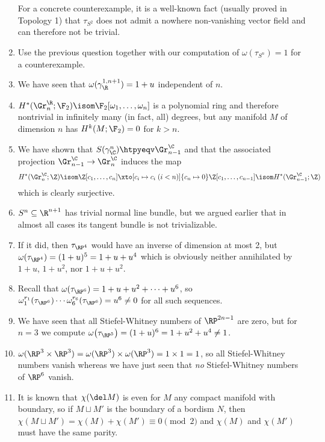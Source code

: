 \begin{answers}
\begin{enumerate}
			For a concrete counterexample, it is a well-known fact (usually proved in Topology 1) that $\tau_{S^2}$ does not admit a nowhere non-vanishing vector field and can therefore not be trivial.
		\item {} Use the previous question together with our computation of $\omega(\tau_{S^n}) = 1$ for a counterexample.
		\item We have seen that $\omega(\gamma_\R^{1, n + 1}) = 1 + u$ independent of $n$.
		\item {} $H^*(\Gr_n^\R; \F_2) \isom \F_2[\omega_1, \ldots, \omega_n]$ is a polynomial ring and therefore nontrivial in infinitely many (in fact, all) degrees, but any manifold $M$ of dimension $n$ has $H^k(M; \F_2) = 0$ for $k > n$.
		\item {} We have shown that $S(\gamma_\C^n) \htpyeqv \Gr^\C_{n - 1}$ and that the associated projection $\Gr_{n - 1}^\C \to \Gr_n^\C$ induces the map
			\begin{equation*}
				H^*(\Gr_n^\C; \Z) \isom \Z[c_1, \ldots, c_n] \xto[c_i \mapsto c_i\; (i < n)]{c_n \mapsto 0} \Z[c_1, \ldots, c_{n - 1}] \isom H^*(\Gr_{n - 1}^\C; \Z) 
			\end{equation*}
			which is clearly surjective.
		\item {} $S^n \subseteq \R^{n + 1}$ has trivial normal line bundle, but we argued earlier that in almost all cases its tangent bundle is not trivializable.
		\item {} If it did, then $\tau_{\RP^4}$ would have an inverse of dimension at most 2, but $\omega(\tau_{\RP^4}) = (1 + u)^5 = 1 + u + u^4$ which is obviously neither annihilated by $1 + u$, $1 + u^2$, nor $1 + u + u^2$.
		\item {} Recall that $\omega(\tau_{\RP^6}) = 1 + u + u^2 + \cdots + u^6$, so $\omega_1^{r_1}(\tau_{\RP^6}) \cdots \omega_6^{r_6}(\tau_{\RP^6}) = u^6 \neq 0$ for all such sequences.
		\item {} We have seen that all Stiefel-Whitney numbers of $\RP^{2n - 1}$ are zero, but for $n = 3$ we compute $\omega\big(\tau_{\RP^5}\big) = (1 + u)^6 = 1 + u^2 + u^4 \neq 1$.
		\item {} $\omega(\RP^3 \times \RP^3) = \omega(\RP^3) \times \omega(\RP^3) = 1 \times 1 = 1$, so all Stiefel-Whitney numbers vanish whereas we have just seen that \emph{no} Stiefel-Whitney numbers of $\RP^6$ vanish.
		\item {} It is known that $\chi(\del M)$ is even for $M$ any compact manifold with boundary, so if $M \sqcup M'$ is the boundary of a bordism $N$, then $\chi(M \sqcup M') = \chi(M) + \chi(M') \equiv 0 \pmod 2$ and $\chi(M)$ and $\chi(M')$ must have the same parity.

\end{enumerate}
\end{answers}
